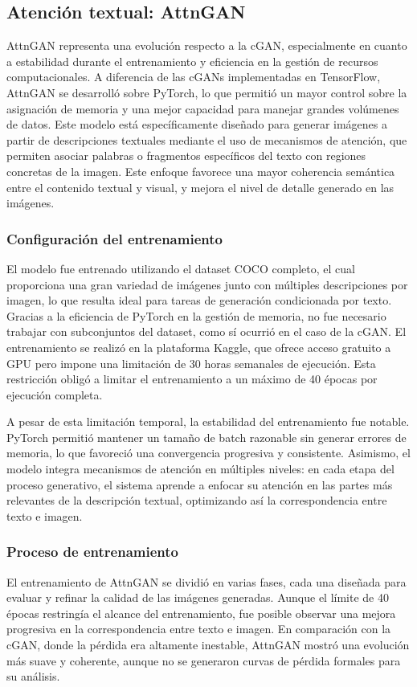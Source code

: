 \subsection{Atención textual: AttnGAN}
AttnGAN representa una evolución respecto a la cGAN, especialmente en cuanto a estabilidad durante el entrenamiento y eficiencia en la gestión de recursos computacionales. A diferencia de las cGANs implementadas en TensorFlow, AttnGAN se desarrolló sobre PyTorch, lo que permitió un mayor control sobre la asignación de memoria y una mejor capacidad para manejar grandes volúmenes de datos. Este modelo está específicamente diseñado para generar imágenes a partir de descripciones textuales mediante el uso de mecanismos de atención, que permiten asociar palabras o fragmentos específicos del texto con regiones concretas de la imagen. Este enfoque favorece una mayor coherencia semántica entre el contenido textual y visual, y mejora el nivel de detalle generado en las imágenes.

\subsubsection{Configuración del entrenamiento}
El modelo fue entrenado utilizando el dataset COCO completo, el cual proporciona una gran variedad de imágenes junto con múltiples descripciones por imagen, lo que resulta ideal para tareas de generación condicionada por texto. Gracias a la eficiencia de PyTorch en la gestión de memoria, no fue necesario trabajar con subconjuntos del dataset, como sí ocurrió en el caso de la cGAN. El entrenamiento se realizó en la plataforma Kaggle, que ofrece acceso gratuito a GPU pero impone una limitación de 30 horas semanales de ejecución. Esta restricción obligó a limitar el entrenamiento a un máximo de 40 épocas por ejecución completa.

A pesar de esta limitación temporal, la estabilidad del entrenamiento fue notable. PyTorch permitió mantener un tamaño de batch razonable sin generar errores de memoria, lo que favoreció una convergencia progresiva y consistente. Asimismo, el modelo integra mecanismos de atención en múltiples niveles: en cada etapa del proceso generativo, el sistema aprende a enfocar su atención en las partes más relevantes de la descripción textual, optimizando así la correspondencia entre texto e imagen.

\subsubsection{Proceso de entrenamiento}
El entrenamiento de AttnGAN se dividió en varias fases, cada una diseñada para evaluar y refinar la calidad de las imágenes generadas. Aunque el límite de 40 épocas restringía el alcance del entrenamiento, fue posible observar una mejora progresiva en la correspondencia entre texto e imagen. En comparación con la cGAN, donde la pérdida era altamente inestable, AttnGAN mostró una evolución más suave y coherente, aunque no se generaron curvas de pérdida formales para su análisis.

